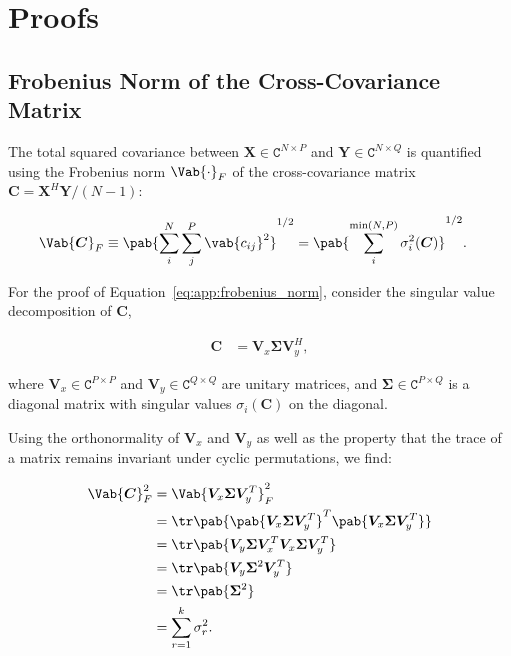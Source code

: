 \chapter{Proofs} 

\section{Frobenius Norm of the Cross-Covariance Matrix}\label{app:proof:frobenius_norm}
The total squared covariance between $\bm{X} \in \mathtt{C}^{N \times P}$ and $\bm{Y}\in \mathtt{C}^{N \times Q}$ is quantified using the Frobenius norm $\Vab{\cdot}_F$ of the cross-covariance matrix $\bm{C} = \bm{X}^H \bm{Y} / (N-1)$:

\begin{align}\label{eq:app:frobenius_norm}
    \Vab{\bm{C}}_F &\equiv  \pab{\sum_i^N \sum_j^P \vab{c_{ij}}^2}^{1/2} = \pab{\sum_{i}^{\min(N, P)} \sigma_i^2(\bm{C})}^{1/2}.
\end{align}

For the proof of Equation~\eqref{eq:app:frobenius_norm}, consider the singular value decomposition of $\bm{C}$,

\begin{align}
    \bm{C} &= \bm{V}_x \bm{\Sigma} \bm{V}_y^H,
\end{align}

where $\bm{V}_x \in \mathtt{C}^{P \times P}$ and $\bm{V}_y \in \mathtt{C}^{Q \times Q}$ are unitary matrices, and $\bm{\Sigma} \in \mathtt{C}^{P \times Q}$ is a diagonal matrix with singular values $\sigma_i(\bm{C})$ on the diagonal.

Using the orthonormality of $\bm{V}_x$ and $\bm{V}_y$ as well as the property that the trace of a matrix remains invariant under cyclic permutations, we find:

\begin{align*}
    \Vab{\bm{C}}_F^2 &= \Vab{\bm{V}_x\bm{\Sigma}\bm{V}_y^T}_F^2 \\
    &= \tr \pab{\pab{\bm{V}_x\bm{\Sigma}\bm{V}_y^T}^T\pab{\bm{V}_x\bm{\Sigma}\bm{V}_y^T}} \\
    &= \tr \pab{\bm{V}_y\bm{\Sigma}\bm{V}_x^T\bm{V}_x\bm{\Sigma}\bm{V}_y^T} \\
    &= \tr \pab{\bm{V}_y\bm{\Sigma}^2\bm{V}_y^T} \\
    &= \tr \pab{\bm{\Sigma}^2} \\
    &= \sum_{r=1}^k \sigma_r^2.
\end{align*}




